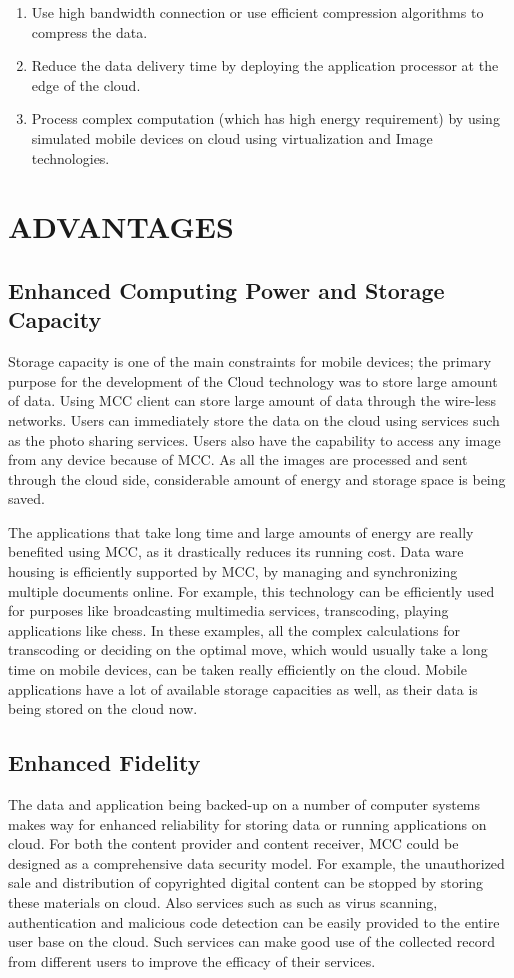 \documentclass[10pt, conference, compsocconf]{IEEEtran}
\begin{document}
\begin{enumerate}
\item Use high bandwidth connection or use efficient compression algorithms to compress the data.
\item Reduce the data delivery time by deploying the application processor at the edge of the cloud.
\item Process complex computation (which has high energy requirement) by using simulated mobile devices on cloud using virtualization and Image technologies.
\end{enumerate}

\section{ADVANTAGES}
\subsection{Enhanced Computing Power and Storage Capacity}
Storage capacity is one of the main constraints for mobile devices; the primary purpose for the development of the Cloud technology was to store large amount of data. Using MCC client can store large amount of data through the wire-less networks. Users can immediately store the data on the cloud using services such as the photo sharing services. Users also have the capability to access any image from any device because of MCC. As all the images are processed and sent through the cloud side, considerable amount of energy and storage space is being saved.


The applications that take long time and large amounts of energy are really benefited using MCC, as it drastically reduces its running cost. Data ware housing is efficiently supported by MCC, by managing and synchronizing multiple documents online. For example, this technology can be efficiently used for purposes like broadcasting multimedia services, transcoding, playing applications like chess. In these examples, all the complex calculations for transcoding or deciding on the optimal move, which would usually take a long time on mobile devices, can be taken really efficiently on the cloud. Mobile applications have a lot of available storage capacities as well, as their data is being stored on the cloud now.


\subsection{Enhanced Fidelity}
The data and application being backed-up on a number of computer systems makes way for enhanced reliability for storing data or running applications on cloud. For both the content provider and content receiver, MCC could be designed as a comprehensive data security model. For example, the unauthorized sale and distribution of copyrighted digital content can be stopped by storing these materials on cloud. Also services such as such as virus scanning, authentication and malicious code detection can be easily provided to the entire user base on the cloud. Such services can make good use of the collected record from different users to improve the efficacy of their services.
\end{document}
